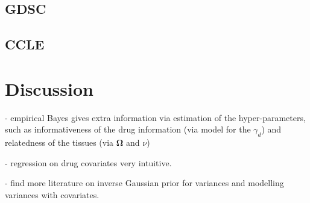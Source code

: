 \documentclass[a4paper,hidelinks]{article}\usepackage[]{graphicx}\usepackage[]{color}
\newcommand{\0}{\bm{0}}
\renewcommand{\(}{\left(}
\renewcommand{\)}{\right)}
\renewcommand{\[}{\left[}
\renewcommand{\]}{\right]}
\begin{document}
	\subsection{GDSC}
	
	\subsection{CCLE}
	
	\section{Discussion}
	- empirical Bayes gives extra information via estimation of the hyper-parameters, such as informativeness of the drug information (via model for the $\gamma_d$) and relatedness of the tissues (via $\bm{\Omega}$ and $\nu$)
	
	- regression on drug covariates very intuitive.
	
	- find more literature on inverse Gaussian prior for variances and modelling variances with covariates.
	
	 
	
\end{document}
